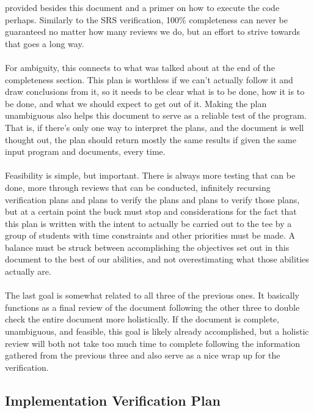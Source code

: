 \documentclass[12pt, titlepage]{article}
\begin{document}
provided besides this document and a primer on how to execute the code perhaps. Similarly to the SRS verification, 100\% completeness can never be guaranteed no matter how many
reviews we do, but an effort to strive towards that goes a long way.\\\\ For ambiguity, this connects to what was talked about at the end of the completeness section. 
This plan is worthless if we can’t actually follow it and draw conclusions from it, so it needs to be clear what is to be done, how it is to be done, and what we should expect
to get out of it. Making the plan unambiguous also helps this document to serve as a reliable test of the program. That is, if there’s only one way to interpret the plans, 
and the document is well thought out, the plan should return mostly the same results if given the same input program and documents, every time.\\\\
Feasibility is simple, but important. There is always more testing that can be done, more through reviews that can be conducted, infinitely recursing verification plans
and plans to verify the plans and plans to verify those plans, but at a certain point the buck must stop and considerations for the fact that this plan is written
with the intent to actually be carried out to the tee by a group of students with time constraints and other priorities must be made. A balance must be struck between
accomplishing the objectives set out in this document to the best of our abilities, and not overestimating what those abilities actually are.\\\\ The last goal is somewhat
related to all three of the previous ones. It basically functions as a final review of the document following the other three to double check the entire document more
holistically. If the document is complete, unambiguous, and feasible, this goal is likely already accomplished, but a holistic review will both not take too much time to
complete following the information gathered from the previous three and also serve as a nice wrap up for the verification.

\subsection{Implementation Verification Plan}

\end{document}

